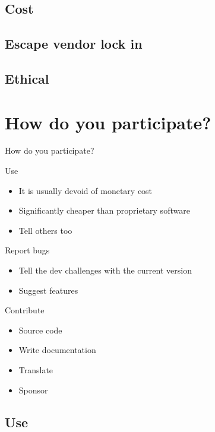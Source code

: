 \documentclass{beamer}
\begin{document}
	\subsection{Cost}
	\subsection{Escape vendor lock in}
	\subsection{Ethical}


	\section{How do you participate?}
	\begin{frame}{How do you participate?}
			\begin{block}{Use}
				\begin{itemize}
					\item It is usually devoid of monetary cost
					\item Significantly cheaper than proprietary software
					\item Tell others too
				\end{itemize}
			\end{block}
			\begin{block}{Report bugs}
				\begin{itemize}
					\item Tell the dev challenges with the current version
					\item Suggest features
				\end{itemize}
			\end{block}
			\begin{block}{Contribute}
				\begin{itemize}
					\item Source code
					\item Write documentation
					\item Translate 
					\item Sponsor
				\end{itemize}
			\end{block}
		\end{frame}
	\subsection{Use}
\end{document}

